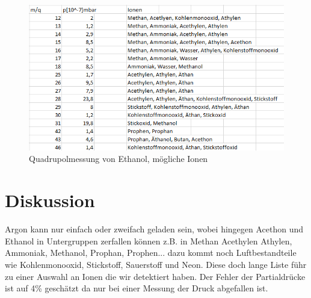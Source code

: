 \documentclass[10pt,a4paper]{article}
\begin{document}
\begin{figure}[h]
	\includegraphics[scale = 0.5]{ethanoltab.png}
	\centering
	\caption{Quadrupolmessung von Ethanol, mögliche Ionen}
	\label{ethatab}
\end{figure}

\section{Diskussion}

Argon kann nur einfach oder zweifach geladen sein, wobei hingegen Acethon und Ethanol in Untergruppen zerfallen können z.B. in Methan Acethylen Athylen, Ammoniak, Methanol, Prophan, Prophen... dazu kommt noch Luftbestandteile wie Kohlenmonooxid, Stickstoff, Sauerstoff und Neon. Diese doch lange Liste führ zu einer Auswahl an Ionen die wir detektiert haben. Der Fehler der Partialdrücke ist auf 4\% geschätzt da nur bei einer Messung der Druck abgefallen ist.
\end{document}
